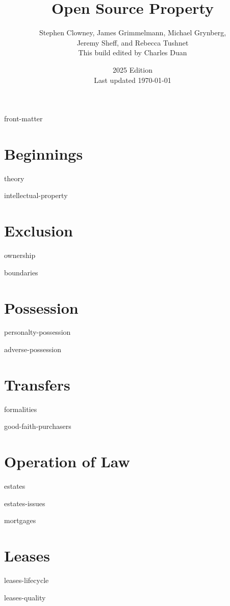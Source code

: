 \documentclass[12pt]{book}
\title{Open Source Property}
\author{Stephen Clowney, James Grimmelmann, Michael Grynberg,\\
Jeremy Sheff, and Rebecca Tushnet \\[12pt]
This build edited by Charles Duan}
\date{2025 Edition \\ Last updated \today}
\begin{document}
\sloppy
\raggedbottom
\frenchspacing
{}
\parskip=0pt



\makevolume

\tableofcontents

\module front-matter

\mainmatter

\part{Beginnings}

\module theory

\module intellectual-property

\part{Exclusion}

\module ownership

\module boundaries

\part{Possession}

\module personalty-possession

\module adverse-possession


\part{Transfers}

\module formalities

\module good-faith-purchasers



\part{Operation of Law}

\module estates

\module estates-issues

\module mortgages



\part{Leases}

\module leases-lifecycle

\module leases-quality
\end{document}
